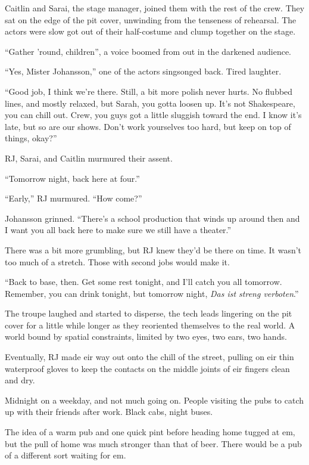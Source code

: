 Caitlin and Sarai, the stage manager, joined them with the rest of the crew. They sat on the edge of the pit cover, unwinding from the tenseness of rehearsal. The actors were slow got out of their half-costume and clump together on the stage.

``Gather 'round, children'', a voice boomed from out in the darkened audience.

``Yes, Mister Johansson,'' one of the actors singsonged back. Tired laughter.

``Good job, I think we're there. Still, a bit more polish never hurts. No flubbed lines, and mostly relaxed, but Sarah, you gotta loosen up. It's not Shakespeare, you can chill out. Crew, you guys got a little sluggish toward the end. I know it's late, but so are our shows. Don't work yourselves too hard, but keep on top of things, okay?''

RJ, Sarai, and Caitlin murmured their assent.

``Tomorrow night, back here at four.''

``Early,'' RJ murmured. ``How come?''

Johansson grinned. ``There's a school production that winds up around then and I want you all back here to make sure we still have a theater.''

There was a bit more grumbling, but RJ knew they'd be there on time. It wasn't too much of a stretch. Those with second jobs would make it.

``Back to base, then. Get some rest tonight, and I'll catch you all tomorrow. Remember, you can drink tonight, but tomorrow night, \emph{Das ist streng verboten}.''

The troupe laughed and started to disperse, the tech leads lingering on the pit cover for a little while longer as they reoriented themselves to the real world. A world bound by spatial constraints, limited by two eyes, two ears, two hands.

Eventually, RJ made eir way out onto the chill of the street, pulling on eir thin waterproof gloves to keep the contacts on the middle joints of eir fingers clean and dry.

Midnight on a weekday, and not much going on. People visiting the pubs to catch up with their friends after work. Black cabs, night buses.

The idea of a warm pub and one quick pint before heading home tugged at em, but the pull of home was much stronger than that of beer. There would be a pub of a different sort waiting for em.

